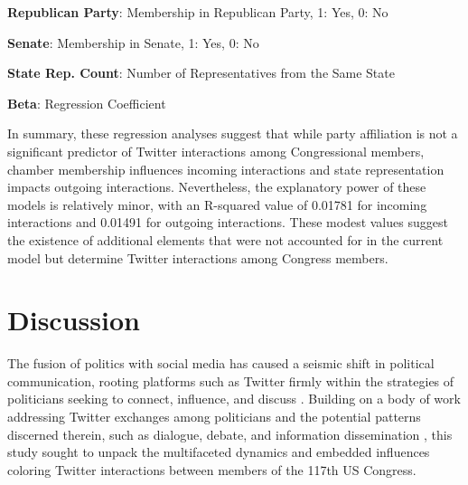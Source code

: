 \documentclass[11pt]{article}
\begin{document}
\begin{table}[h]
\caption{Regression results for variables predicting outgoing interactions}
\label{table:outgoing_interactions}
\begin{threeparttable}
\renewcommand{\TPTminimum}{\linewidth}
\begin{tablenotes}
\footnotesize
\item \textbf{Republican Party}: Membership in Republican Party, 1: Yes, 0: No
\item \textbf{Senate}: Membership in Senate, 1: Yes, 0: No
\item \textbf{State Rep. Count}: Number of Representatives from the Same State
\item \textbf{Beta}: Regression Coefficient
\end{tablenotes}
\end{threeparttable}
\end{table}


In summary, these regression analyses suggest that while party affiliation is not a significant predictor of Twitter interactions among Congressional members, chamber membership influences incoming interactions and state representation impacts outgoing interactions. Nevertheless, the explanatory power of these models is relatively minor, with an R-squared value of 0.01781 for incoming interactions and 0.01491 for outgoing interactions. These modest values suggest the existence of additional elements that were not accounted for in the current model but determine Twitter interactions among Congress members.

\section*{Discussion}

The fusion of politics with social media has caused a seismic shift in political communication, rooting platforms such as Twitter firmly within the strategies of politicians seeking to connect, influence, and discuss \cite{Kreiss2018InTO, Enli2013PERSONALIZEDCI}. Building on a body of work addressing Twitter exchanges among politicians and the potential patterns discerned therein, such as dialogue, debate, and information dissemination \cite{Garimella2018PoliticalDO, Theocharis2020TheDO, Hua2020CharacterizingTU}, this study sought to unpack the multifaceted dynamics and embedded influences coloring Twitter interactions between members of the 117th US Congress.
\end{document}

